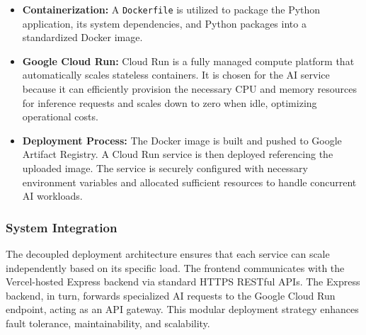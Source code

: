 \begin{itemize}
    \item \textbf{Containerization:} A \texttt{Dockerfile} is utilized to package the Python application, its system dependencies, and Python packages into a standardized Docker image.
    \item \textbf{Google Cloud Run:} Cloud Run is a fully managed compute platform that automatically scales stateless containers. It is chosen for the AI service because it can efficiently provision the necessary CPU and memory resources for inference requests and scales down to zero when idle, optimizing operational costs.
    \item \textbf{Deployment Process:} The Docker image is built and pushed to Google Artifact Registry. A Cloud Run service is then deployed referencing the uploaded image. The service is securely configured with necessary environment variables and allocated sufficient resources to handle concurrent AI workloads.
\end{itemize}

\subsubsection{System Integration}
The decoupled deployment architecture ensures that each service can scale independently based on its specific load. The frontend communicates with the Vercel-hosted Express backend via standard HTTPS RESTful APIs. The Express backend, in turn, forwards specialized AI requests to the Google Cloud Run endpoint, acting as an API gateway. This modular deployment strategy enhances fault tolerance, maintainability, and scalability.

\endgroup